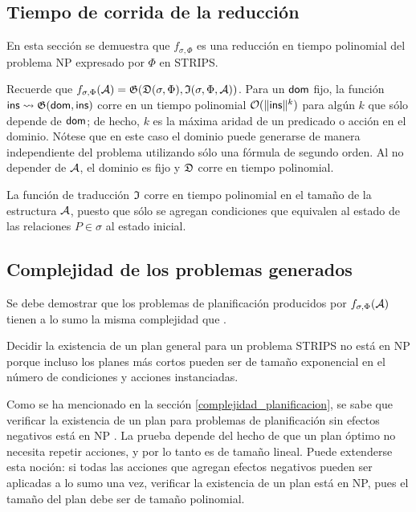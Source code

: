 \subsection{Tiempo de corrida de la reducción}
En esta sección se demuestra que $f_{\sigma,\Phi}$ es una reducción en tiempo
polinomial del problema NP expresado por $\Phi$ en STRIPS.

Recuerde que 
$ f_{\sigma,\Phi}(\mathcal{A}) = \mathfrak{G}(\mathfrak{D}(\sigma,\Phi),\mathfrak{I}(\sigma,\Phi,\mathcal{A}))
$.
Para un $\mathsf{dom}$ fijo, la función
$\mathsf{ins}\leadsto\mathfrak{G}(\mathsf{dom}, \mathsf{ins})$ corre en un tiempo polinomial
$\mathcal{O}(\|\mathsf{ins}\|^k)$ para algún $k$ que sólo depende de $\mathsf{dom}$; de hecho,
$k$ es la máxima aridad de un predicado o acción en el dominio. Nótese que en
este caso el dominio puede generarse de manera independiente del problema 
utilizando sólo una fórmula de segundo orden. Al no depender de $\mathcal{A}$, el
dominio es fijo y $\mathfrak{D}$ corre en tiempo polinomial.

La función de traducción $\mathfrak{I}$ corre en tiempo
polinomial en el tamaño de la estructura $\mathcal{A}$, puesto que sólo se agregan
condiciones que equivalen al estado de las relaciones $P\in\sigma$ al estado inicial.


\subsection{Complejidad de los problemas generados}
Se debe demostrar que los problemas de planificación producidos 
por $f_{\sigma,\Phi}(\mathcal{A})$ tienen a lo sumo la misma
complejidad que \SOE.

Decidir la existencia de un plan general para un problema
STRIPS no está en NP porque incluso los planes más cortos pueden
ser de tamaño exponencial en el número de condiciones y acciones instanciadas.

Como se ha mencionado en la sección \ref{complejidad_planificacion}, 
se sabe que verificar la existencia de un plan para 
problemas de planificación
sin efectos negativos está en NP \citep{bylander:plan-complexity}. La prueba
depende del hecho de que un plan óptimo no necesita repetir acciones, y por lo
tanto es de tamaño lineal. Puede extenderse esta noción: si todas las acciones que
agregan efectos negativos pueden ser aplicadas a lo sumo una vez, verificar la
existencia de un plan está en NP, pues el tamaño del plan debe ser de tamaño
polinomial.

